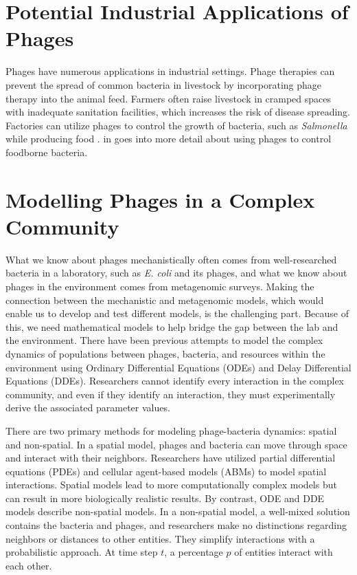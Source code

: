 \section{Potential Industrial Applications of Phages}
Phages have numerous applications in industrial settings. 
Phage therapies can prevent the spread of common bacteria in livestock by incorporating phage therapy into the animal feed. 
Farmers often raise livestock in cramped spaces with inadequate sanitation facilities, which increases the risk of disease spreading. 
Factories can utilize phages to control the growth of bacteria, such as \textit{Salmonella} while producing food \cite{sofferBacteriophagesSafelyReduce2016, kowalskaFreshVegetablesFruit2023}. 
 in  goes into more detail about using phages to control foodborne bacteria. 

\section{Modelling Phages in a Complex Community}
What we know about phages mechanistically often comes from well-researched bacteria in a laboratory, such as \textit{E. coli} and its phages, and what we know about phages in the environment comes from metagenomic surveys. 
Making the connection between the mechanistic and metagenomic models, which would enable us to develop and test different models, is the challenging part. 
Because of this, we need mathematical models to help bridge the gap between the lab and the environment. 
There have been previous attempts to model the complex dynamics of populations between phages, bacteria, and resources within the environment using Ordinary Differential Equations (ODEs) and Delay Differential Equations (DDEs).
Researchers cannot identify every interaction in the complex community, and even if they identify an interaction, they must experimentally derive the associated parameter values. 

There are two primary methods for modeling phage-bacteria dynamics: spatial and non-spatial.
In a spatial model, phages and bacteria can move through space and interact with their neighbors. 
Researchers have utilized partial differential equations (PDEs) and cellular agent-based models (ABMs) to model spatial interactions.
Spatial models lead to more computationally complex models but can result in more biologically realistic results. 
By contrast, ODE and DDE models describe non-spatial models. 
In a non-spatial model, a well-mixed solution contains the bacteria and phages, and researchers make no distinctions regarding neighbors or distances to other entities. 
They simplify interactions with a probabilistic approach.
At time step $t$, a percentage $p$ of entities interact with each other.

